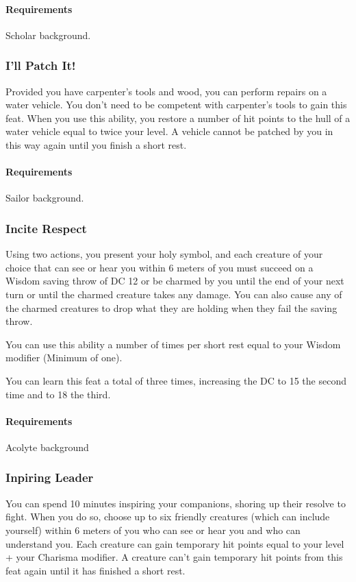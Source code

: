     \paragraph{Requirements} Scholar background.
\subsubsection{I'll Patch It!} \label{feat::illpatchit}
    Provided you have carpenter's tools and wood, you can perform repairs on a water vehicle.
    You don't need to be competent with carpenter's tools to gain this feat.
    When you use this ability, you restore a number of hit points to the hull of a water vehicle equal to twice your level.
    A vehicle cannot be patched by you in this way again until you finish a short rest.
    \paragraph{Requirements} Sailor background.
\subsubsection{Incite Respect} \label{feat::inciterespect}
    Using two actions, you present your holy symbol, and each creature of your choice that can see or hear you within 6 meters of you must succeed on a Wisdom saving throw of DC 12 or be charmed by you until the end of your next turn or until the charmed creature takes any damage.
    You can also cause any of the charmed creatures to drop what they are holding when they fail the saving throw.

    You can use this ability a number of times per short rest equal to your Wisdom modifier (Minimum of one).

    You can learn this feat a total of three times, increasing the DC to 15 the second time and to 18 the third.
    \paragraph{Requirements} Acolyte background
\subsubsection{Inpiring Leader} \label{feat::inspiringleader}
    You can spend 10 minutes inspiring your companions, shoring up their resolve to fight.
    When you do so, choose up to six friendly creatures (which can include yourself) within 6 meters of you who can see or hear you and who can understand you.
    Each creature can gain temporary hit points equal to your level + your Charisma modifier.
    A creature can't gain temporary hit points from this feat again until it has finished a short rest.
